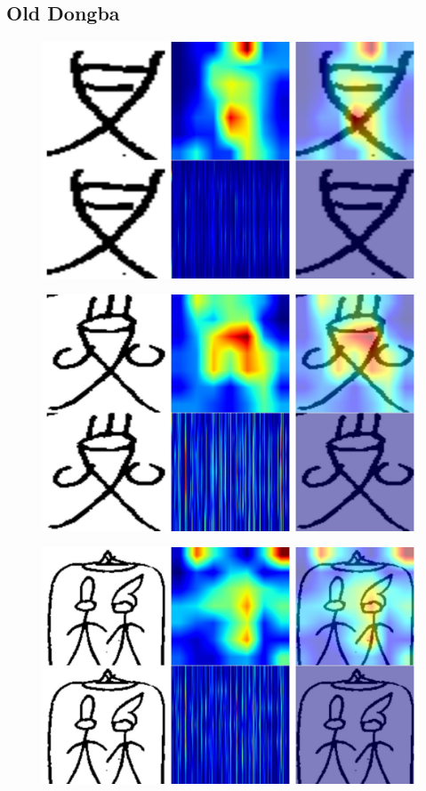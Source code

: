 \documentclass[11pt,a4paper,oneside]{report}
\begin{document}
\subsection{Old Dongba}
 \begin{figure}[H]
    \centering
    \includegraphics[width=0.9\linewidth]{Visualizations/Grad-CAM/Old-Naxi/gradcam_2_class2_box133_combined.pdf}
\end{figure}
 \begin{figure}[H]
    \centering
    \includegraphics[width=0.9\linewidth]{Visualizations/Grad-CAM/Old-Naxi/gradcam_3_class61_box256_combined.pdf}
\end{figure}
 \begin{figure}[H]
    \centering
    \includegraphics[width=0.9\linewidth]{Visualizations/Grad-CAM/Old-Naxi/gradcam_14_class105_box1232_combined.pdf}
\end{figure}
\end{document}
